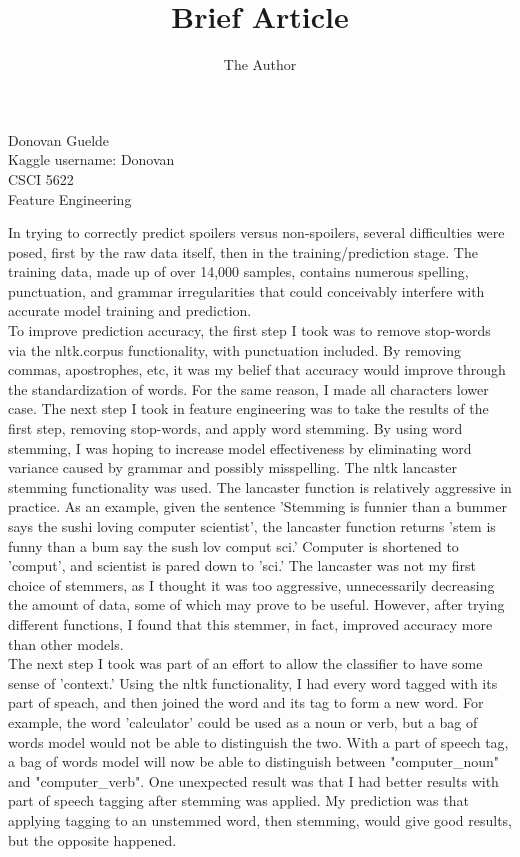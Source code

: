 \documentclass[11pt, oneside]{article}   	%
\title{Brief Article}
\author{The Author}
\begin{document}
\begin{flushright}
Donovan Guelde\\
Kaggle username: Donovan\\
CSCI 5622\\
Feature Engineering\\
\end{flushright}
\indent In trying to correctly predict spoilers versus non-spoilers, several difficulties were posed, first by the raw data itself, then in the training/prediction stage.  The training data, made up of over 14,000 samples, contains numerous spelling, punctuation, and grammar irregularities that could conceivably interfere with accurate model training and prediction.  \\
\indent To improve prediction accuracy, the first step I took was to remove stop-words via the nltk.corpus functionality, with punctuation included.  By removing commas, apostrophes, etc, it was my belief that accuracy would improve through the standardization of words.  For the same reason, I made all characters lower case.  The next step I took in feature engineering was to take the results of the first step, removing stop-words, and apply word stemming.  By using word stemming, I was hoping to increase model effectiveness by eliminating word variance caused by grammar and possibly misspelling.  The nltk lancaster stemming functionality was used.  The lancaster function is relatively aggressive in practice.  As an example, given the sentence 'Stemming is funnier than a bummer says the sushi loving computer scientist', the lancaster function returns 'stem is funny than a bum say the sush lov comput sci.'  Computer is shortened to 'comput', and scientist is pared down to 'sci.'  The lancaster was not my first choice of stemmers, as I thought it was too aggressive, unnecessarily decreasing the amount of data, some of which may prove to be useful.  However, after trying different functions, I found that this stemmer, in fact, improved accuracy more than other models.\\
\indent The next step I took was part of an effort to allow the classifier to have some sense of 'context.'  Using the nltk functionality, I had every word tagged with its part of speach, and then joined the word and its tag to form a new word.  For example, the word 'calculator' could be used as a noun or verb, but a bag of words model would not be able to distinguish the two.  With a part of speech tag, a bag of words model will now be able to distinguish between "computer\_noun" and "computer\_verb".  One unexpected result was that I had better results with part of speech tagging after stemming was applied.  My prediction was that applying tagging to an unstemmed word, then stemming, would give good results, but the opposite happened.\\
\end{document}
